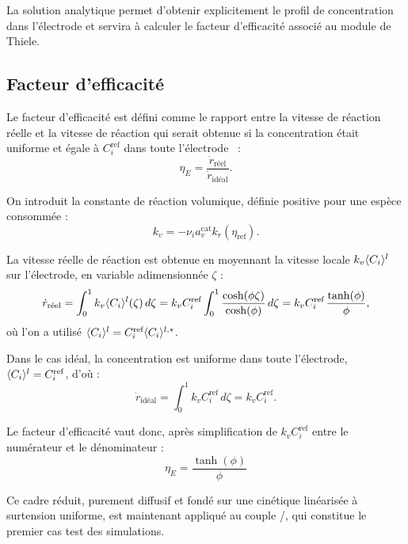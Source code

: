 La solution analytique permet d'obtenir explicitement le profil de
concentration dans l'électrode et servira à calculer le facteur
d'efficacité associé au module de Thiele.

\subsection*{Facteur d'efficacité}

Le facteur d'efficacité est défini comme le rapport entre la vitesse de
réaction réelle et la vitesse de réaction qui serait obtenue si la
concentration était uniforme et égale à $C_i^{\text{ref}}$ dans toute
l'électrode~\cite{wanPotentialDependentThiele} :
\begin{equation}
\eta_E = \frac{\dot{r}_{\text{réel}}}{\dot{r}_{\text{idéal}}} .
\end{equation}

On introduit la constante de réaction volumique, définie positive pour une
espèce consommée :
\begin{equation}
    k_v
    =
    -\nu_i a_v^{\mathrm{cat}}
    k_r(\eta_{\mathrm{ref}}).
    \label{eq:kv}
\end{equation}

La vitesse réelle de réaction est obtenue en moyennant la vitesse locale
$k_v \langle C_i \rangle^{l}$ sur l'électrode, en variable adimensionnée $\zeta$ :
\begin{equation}
\dot{r}_{\text{réel}}
= \int_{0}^{1} k_v \langle C_i \rangle^{l}(\zeta)\, d\zeta
= k_v C_i^{\text{ref}} \int_{0}^{1}
\frac{\cosh(\phi\zeta)}{\cosh(\phi)}\, d\zeta
= k_v C_i^{\text{ref}}\,\frac{\tanh(\phi)}{\phi} ,
\end{equation}
où l'on a utilisé $\langle C_i \rangle^{l} = C_i^{\text{ref}}\langle C_i \rangle^{l,*}$.

Dans le cas idéal, la concentration est uniforme dans toute l'électrode,
$\langle C_i \rangle^{l} = C_i^{\text{ref}}$, d'où :
\begin{equation}
\dot{r}_{\text{idéal}}
= \int_{0}^{1} k_v C_i^{\text{ref}}\, d\zeta
= k_v C_i^{\text{ref}} .
\end{equation}

Le facteur d'efficacité vaut donc, après simplification de $k_v C_i^{\text{ref}}$
entre le numérateur et le dénominateur :
\begin{equation}
\boxed{\;\eta_E = \frac{\tanh(\phi)}{\phi}\;}
\end{equation}

Ce cadre réduit, purement diffusif et fondé sur une cinétique linéarisée à
surtension uniforme, est maintenant appliqué au couple /, qui
constitue le premier cas test des simulations.